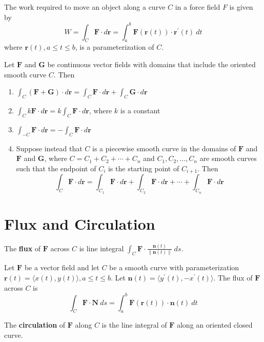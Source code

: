 \documentclass{article}
\begin{document}
The work required to move an object along a curve $C$ in a force field $F$ is given by
\[W=\int_C\mathbf{F}\cdot d\mathbf{r}=\int_a^b\mathbf{F}(\mathbf{r}(t))\cdot\mathbf{r}^\prime(t)\: dt\]where $\mathbf{r}(t),a\leq t\leq b$, is a parameterization of $C$.
\vspace{1em}

Let $\mathbf{F}$ and $\mathbf{G}$ be continuous vector fields with domains that include the oriented smooth curve $C$. Then
\begin{enumerate}
    \item $\int_C(\mathbf{F}+\mathbf{G})\cdot d\mathbf{r}=\int_C\mathbf{F}\cdot d\mathbf{r}+\int_C\mathbf{G}\cdot d\mathbf{r}$
    \item $\int_C k\mathbf{F}\cdot d\mathbf{r}=k\int_C\mathbf{F}\cdot d\mathbf{r}$, where $k$ is a constant
    \item $\int_{-C}\mathbf{F}\cdot d\mathbf{r}=-\int_C\mathbf{F}\cdot d\mathbf{r}$
    \item Suppose instead that $C$ is a piecewise smooth curve in the domains of $\mathbf{F}$ and $\mathbf{F}$ and $\mathbf{G}$, where $C=C_1+C_2+\cdots+C_n$ and $C_1,C_2,\ldots,C_n$ are smooth curves such that the endpoint of $C_i$ is the starting point of $C_{i+1}$. Then
    \[\int_C\mathbf{F}\cdot d\mathbf{r}=\int_{C_1}\mathbf{F}\cdot d\mathbf{r}+\int_{C_2}\mathbf{F}\cdot d\mathbf{r}+\cdots+\int_{C_n}\mathbf{F}\cdot d\mathbf{r}\]
\end{enumerate}

\section*{Flux and Circulation}

The \textbf{flux} of $\mathbf{F}$ across $C$ is line integral $\int_C\mathbf{F}\cdot\frac{\mathbf{n}(t)}{\|\mathbf{n}(t)\|}\: ds$.
\vspace{1em}

Let $\mathbf{F}$ be a vector field and let $C$ be a smooth curve with parameterization $\mathbf{r}(t)=\langle x(t),y(t)\rangle,a\leq t\leq b$. Let $\mathbf{n}(t)=\langle y^\prime(t),-x^\prime(t)\rangle$. The flux of $\mathbf{F}$ across $C$ is
\[\int_C\mathbf{F}\cdot\mathbf{N}\: ds=\int_a^b\mathbf{F}(\mathbf{r}(t))\cdot\mathbf{n}(t)\: dt\]

The \textbf{circulation} of $\mathbf{F}$ along $C$ is the line integral of $\mathbf{F}$ along an oriented closed curve.
\end{document}
